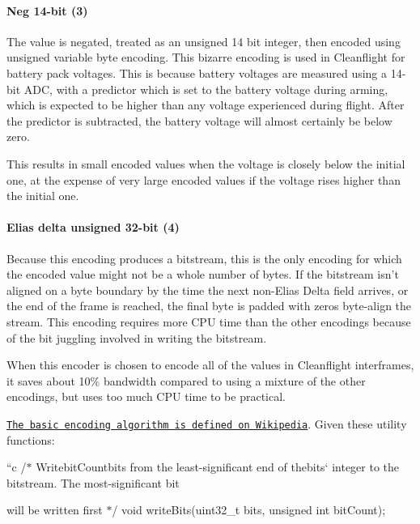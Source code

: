 \paragraph*{Neg 14-\/bit (3)}

The value is negated, treated as an unsigned 14 bit integer, then encoded using unsigned variable byte encoding. This bizarre encoding is used in Cleanflight for battery pack voltages. This is because battery voltages are measured using a 14-\/bit A\+D\+C, with a predictor which is set to the battery voltage during arming, which is expected to be higher than any voltage experienced during flight. After the predictor is subtracted, the battery voltage will almost certainly be below zero.

This results in small encoded values when the voltage is closely below the initial one, at the expense of very large encoded values if the voltage rises higher than the initial one.

\paragraph*{Elias delta unsigned 32-\/bit (4)}

Because this encoding produces a bitstream, this is the only encoding for which the encoded value might not be a whole number of bytes. If the bitstream isn't aligned on a byte boundary by the time the next non-\/\+Elias Delta field arrives, or the end of the frame is reached, the final byte is padded with zeros byte-\/align the stream. This encoding requires more C\+P\+U time than the other encodings because of the bit juggling involved in writing the bitstream.

When this encoder is chosen to encode all of the values in Cleanflight interframes, it saves about 10\% bandwidth compared to using a mixture of the other encodings, but uses too much C\+P\+U time to be practical.

\href{https://en.wikipedia.org/wiki/Elias_delta_coding}{\tt The basic encoding algorithm is defined on Wikipedia}. Given these utility functions\+:

``{\ttfamily c /$\ast$ Write}bit\+Count{\ttfamily bits from the least-\/significant end of the}bits` integer to the bitstream. The most-\/significant bit
\begin{DoxyItemize}
\item will be written first $\ast$/ void write\+Bits(uint32\+\_\+t bits, unsigned int bit\+Count);
\end{DoxyItemize}

